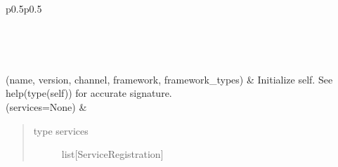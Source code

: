 \documentclass[letterpaper,10pt,english]{sphinxmanual}
\begin{document}
\begin{savenotes}\sphinxatlongtablestart\begin{longtable}[c]{p{0.5\linewidth}p{0.5\linewidth}}
\hline

\endfirsthead

%
{}\\
\hline

\endhead

\hline
{}\\
\endfoot

\endlastfoot

{\hyperref[\detokenize{autoapi/pine/pipelines/app/listener/service_listener/index:pine.pipelines.app.listener.service_listener.ServiceRegistration}]{}}(name, version, channel, framework, framework\_types)
&
Initialize self.  See help(type(self)) for accurate signature.
\\
\hline
{\hyperref[\detokenize{autoapi/pine/pipelines/app/listener/service_listener/index:pine.pipelines.app.listener.service_listener.ServiceListener}]{}}(services=None)
&
\begin{quote}\begin{description}
\item[{type services}] \leavevmode
list{[}ServiceRegistration{]}

\end{description}\end{quote}

\\
\hline
\end{longtable}\sphinxatlongtableend\end{savenotes}

\begin{fulllineitems}
\label{\detokenize{autoapi/pine/pipelines/app/listener/service_listener/index:pine.pipelines.app.listener.service_listener.config}}
\end{fulllineitems}
\end{document}
